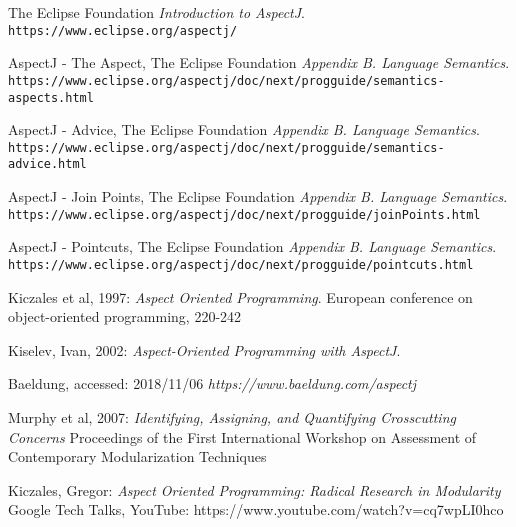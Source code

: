 \documentclass[sigconf]{acmart}
\begin{document}
\begin{thebibliography}{9}
The Eclipse Foundation
\textit{Introduction to AspectJ}. 
\\\texttt{https://www.eclipse.org/aspectj/}

AspectJ - The Aspect, The Eclipse Foundation
\textit{Appendix B. Language Semantics}. 
\\\texttt{https://www.eclipse.org/aspectj/doc/next/progguide/semantics-aspects.html}


AspectJ - Advice, The Eclipse Foundation
\textit{Appendix B. Language Semantics}. 
\\\texttt{https://www.eclipse.org/aspectj/doc/next/progguide/semantics-advice.html}

AspectJ - Join Points, The Eclipse Foundation
\textit{Appendix B. Language Semantics}. 
\\\texttt{https://www.eclipse.org/aspectj/doc/next/progguide/joinPoints.html}

AspectJ - Pointcuts, The Eclipse Foundation
\textit{Appendix B. Language Semantics}. 
\\\texttt{https://www.eclipse.org/aspectj/doc/next/progguide/pointcuts.html}

Kiczales et al, 1997: 
\textit{Aspect Oriented Programming}. 
European conference on object-oriented programming, 220-242

Kiselev, Ivan, 2002: 
\textit{Aspect-Oriented Programming with AspectJ}. 

Baeldung, accessed: 2018/11/06
\textit{https://www.baeldung.com/aspectj}

Murphy et al, 2007: 
\textit{Identifying, Assigning, and Quantifying Crosscutting Concerns}
Proceedings of the First International Workshop on Assessment of Contemporary Modularization Techniques

Kiczales, Gregor:
\textit{Aspect Oriented Programming: Radical Research in Modularity}
Google Tech Talks, YouTube: https://www.youtube.com/watch?v=cq7wpLI0hco
\end{thebibliography}
\end{document}
